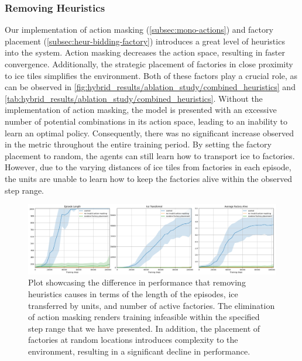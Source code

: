 \subsubsection{Removing Heuristics}

\noindent Our implementation of action masking (\autoref{subsec:mono-actions}) and factory placement (\autoref{subsec:heur-bidding-factory}) introduces a great level of heuristics into the system. Action masking decreases the action space, resulting in faster convergence. Additionally, the strategic placement of factories in close proximity to ice tiles simplifies the environment. Both of these factors play a crucial role, as can be observed in \autoref{fig:hybrid_results/ablation_study/combined_heuristics} and \autoref{tab:hybrid_results/ablation_study/combined_heuristics}. Without the implementation of action masking, the model is presented with an excessive number of potential combinations in its action space, leading to an inability to learn an optimal policy. Consequently, there was no significant increase observed in the  metric throughout the entire training period. By setting the factory placement to random, the agents can still learn how to transport ice to factories. However, due to the varying distances of ice tiles from factories in each episode, the units are unable to learn how to keep the factories alive within the observed step range.

\begin{figure}[htbp]
    \centering
    \includegraphics[width=1\linewidth]{images/results_hybrid/ablation_study/combined_heuristics.png}
    \captionsetup{justification=justified, singlelinecheck=false, width=1\linewidth, labelfont=bf} 
    \caption[]{Plot showcasing the difference in performance that removing heuristics causes in terms of the length of the episodes, ice transferred by units, and number of active factories. The elimination of action masking renders training infeasible within the specified step range that we have presented. In addition, the placement of factories at random locations introduces complexity to the environment, resulting in a significant decline in performance.}
    \label{fig:hybrid_results/ablation_study/combined_heuristics}
\end{figure}


